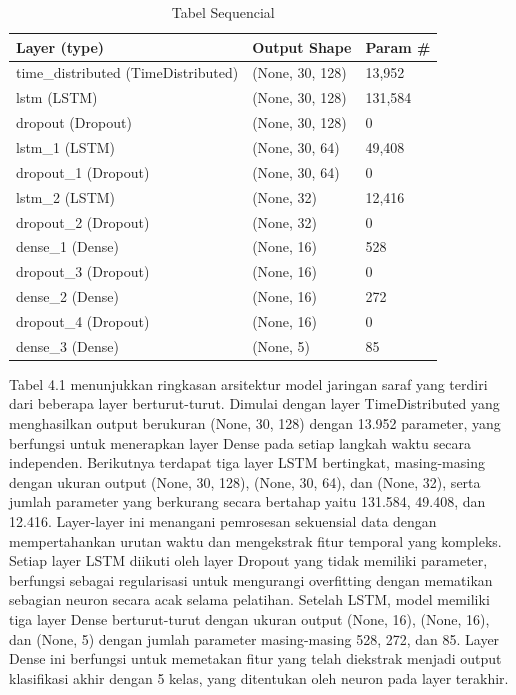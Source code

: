 \begin{table}[htbp]
\centering
\caption{Tabel Sequencial}
\begin{tabular}{|l|l|l|}
\hline
\textbf{Layer (type)} & \textbf{Output Shape} & \textbf{Param \#} \\ \hline
time\_distributed (TimeDistributed) & (None, 30, 128) & 13,952 \\ \hline
lstm (LSTM) & (None, 30, 128) & 131,584 \\ \hline
dropout (Dropout) & (None, 30, 128) & 0 \\ \hline
lstm\_1 (LSTM) & (None, 30, 64) & 49,408 \\ \hline
dropout\_1 (Dropout) & (None, 30, 64) & 0 \\ \hline
lstm\_2 (LSTM) & (None, 32) & 12,416 \\ \hline
dropout\_2 (Dropout) & (None, 32) & 0 \\ \hline
dense\_1 (Dense) & (None, 16) & 528 \\ \hline
dropout\_3 (Dropout) & (None, 16) & 0 \\ \hline
dense\_2 (Dense) & (None, 16) & 272 \\ \hline
dropout\_4 (Dropout) & (None, 16) & 0 \\ \hline
dense\_3 (Dense) & (None, 5) & 85 \\ \hline
\end{tabular}
\end{table}

Tabel 4.1 menunjukkan ringkasan arsitektur model jaringan saraf yang terdiri dari beberapa layer berturut-turut. 
Dimulai dengan layer TimeDistributed yang menghasilkan output berukuran (None, 30, 128) dengan 13.952 parameter, 
yang berfungsi untuk menerapkan layer Dense pada setiap langkah waktu secara independen. Berikutnya terdapat tiga layer LSTM bertingkat, 
masing-masing dengan ukuran output (None, 30, 128), (None, 30, 64), dan (None, 32), serta jumlah parameter yang berkurang 
secara bertahap yaitu 131.584, 49.408, dan 12.416. Layer-layer ini menangani pemrosesan sekuensial data dengan mempertahankan urutan waktu 
dan mengekstrak fitur temporal yang kompleks. Setiap layer LSTM diikuti oleh layer Dropout yang tidak memiliki parameter, berfungsi sebagai 
regularisasi untuk mengurangi overfitting dengan mematikan sebagian neuron secara acak selama pelatihan. Setelah LSTM, model memiliki tiga 
layer Dense berturut-turut dengan ukuran output (None, 16), (None, 16), dan (None, 5) dengan jumlah parameter masing-masing 528, 272, dan 85. 
Layer Dense ini berfungsi untuk memetakan fitur yang telah diekstrak menjadi output klasifikasi akhir dengan 5 kelas, yang ditentukan oleh 
neuron pada layer terakhir.


